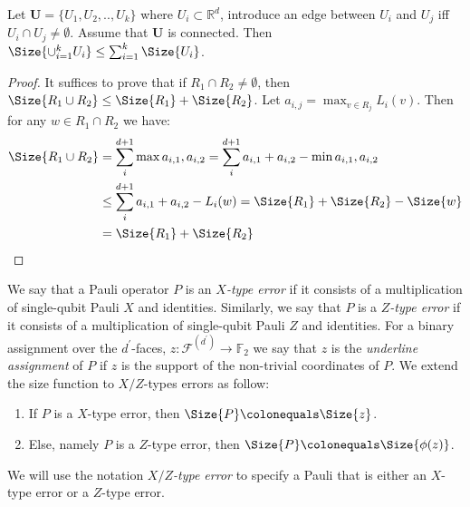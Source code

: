   \begin{claim}
    Let $\mathbf{U} = \{ U_{1}, U_{2} , .. , U_{k} \}$ where $U_{i} \subset \mathbb{R}^{d}$, introduce an edge between $U_{i}$ and $U_{j}$ iff $U_{i} \cap U_{j} \neq \emptyset$. Assume that $\mathbf{U}$ is connected. Then $\Size{\cup^{k}_{i=1} U_{i}} \le \sum^{k}_{i=1}{\Size{U_{i}}}$. 
  \end{claim}
  \begin{proof}
    It suffices to prove that if $R_{1} \cap R_{2} \neq \emptyset$, then $\Size{R_{1} \cup R_{2}} \le \Size{R_{1}} + \Size{R_{2}}$. Let $a_{i,j} = \max_{v \in R_{j}}L_{i}(v)$. Then for any $w \in R_{1}\cap R_{2}$ we have:  
    \begin{equation*}
      \begin{split}
        \Size{R_{1} \cup R_{2}} &= \sum_{i}^{d+1}{\max{ a_{i,1},a_{i,2} } } =  \sum_{i}^{d+1}{a_{i,1} + a_{i,2} - \min{ a_{i,1},a_{i,2} } } \\
        & \le   \sum_{i}^{d+1}{a_{i,1} + a_{i,2} - L_{i}(w) } = \Size{R_{1}} + \Size{R_{2}} - \Size{w}  \\
        &  = \Size{R_{1}} + \Size{R_{2}} 
      \end{split}
    \end{equation*}
  \end{proof}

\begin{definition}
  We say that a Pauli operator $P$ is an \textit{$X$-type error} if it consists of a multiplication of single-qubit Pauli $X$ and identities. Similarly, we say that $P$ is a \textit{$Z$-type error} if it consists of a multiplication of single-qubit Pauli $Z$ and identities. For a binary assignment over the $d^{\prime}$-faces, $z : \mathcal{F}^{(d^{\prime})} \rightarrow \mathbb{F}_{2}$ we say that $z$ is the \textit{underline assignment} of $P$ if $z$ is the support of the non-trivial coordinates of $P$. We extend the size function to $X/Z$-types errors as follow: 
  \begin{enumerate}
    \item If $P$ is a $X$-type error, then $\Size{P} \colonequals \Size{z}$. 
    \item Else, namely $P$ is a $Z$-type error, then $\Size{P} \colonequals \Size{\phi(z)}$. 
  \end{enumerate}
We will use the notation \textit{$X/Z$-type error} to specify a Pauli that is either an $X$-type error or a $Z$-type error.
\end{definition}


